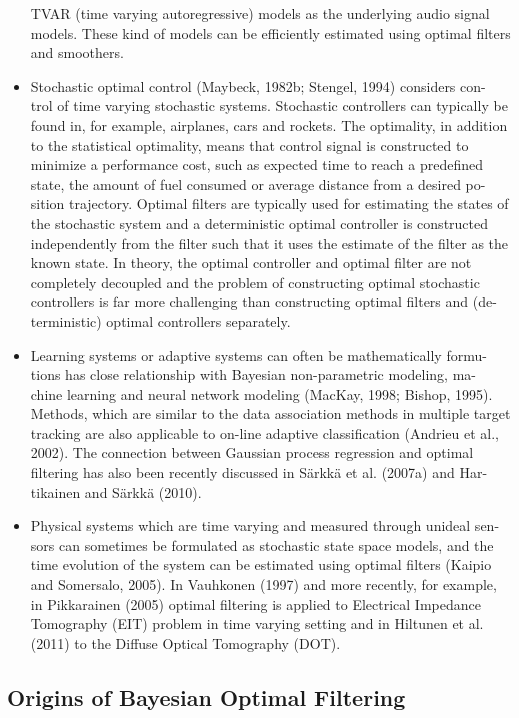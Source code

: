 \documentclass[10pt]{llncs}
\begin{document}
\begin{itemize}
TVAR (time varying autoregressive) models as the underlying audio signal
models. These kind of models can be efficiently estimated using optimal
filters and smoothers.
\item Stochastic optimal control (Maybeck, 1982b; Stengel, 1994) considers con-
trol of time varying stochastic systems. Stochastic controllers can typically
be found in, for example, airplanes, cars and rockets. The optimality, in
addition to the statistical optimality, means that control signal is constructed
to minimize a performance cost, such as expected time to reach a predefined
state, the amount of fuel consumed or average distance from a desired po-
sition trajectory. Optimal filters are typically used for estimating the states
of the stochastic system and a deterministic optimal controller is constructed
independently from the filter such that it uses the estimate of the filter as
the known state. In theory, the optimal controller and optimal filter are not
completely decoupled and the problem of constructing optimal stochastic
controllers is far more challenging than constructing optimal filters and (de-
terministic) optimal controllers separately.
\item Learning systems or adaptive systems can often be mathematically formu-
tions has close relationship with Bayesian non-parametric modeling, ma-
chine learning and neural network modeling (MacKay, 1998; Bishop, 1995).
Methods, which are similar to the data association methods in multiple target
tracking are also applicable to on-line adaptive classification (Andrieu et al.,
2002). The connection between Gaussian process regression and optimal
filtering has also been recently discussed in Särkkä et al. (2007a) and Har-
tikainen and Särkkä (2010).
\item Physical systems which are time varying and measured through unideal sen-
sors can sometimes be formulated as stochastic state space models, and the
time evolution of the system can be estimated using optimal filters (Kaipio
and Somersalo, 2005). In Vauhkonen (1997) and more recently, for example,
in Pikkarainen (2005) optimal filtering is applied to Electrical Impedance
Tomography (EIT) problem in time varying setting and in Hiltunen et al.
(2011) to the Diffuse Optical Tomography (DOT).
\end{itemize}

\subsection{Origins of Bayesian Optimal Filtering} 
\end{document}
